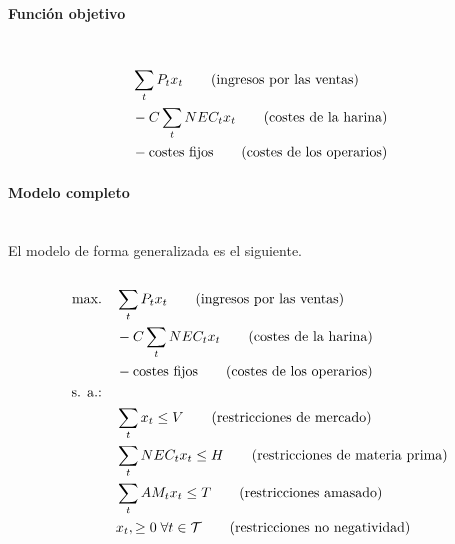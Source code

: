 \paragraph{Función objetivo}\mbox{}\\

\begin{align}
             & \sum_tP_t{x_t}  \qquad \mbox{(ingresos por las ventas)} \notag \\
             & -C\sum_t  NEC_t {x_t} \qquad \mbox{(costes de la harina)} \notag \\
             & -\mbox{costes fijos} \qquad \mbox{(costes de los operarios)} \notag \\
\end{align} 



\paragraph{Modelo completo}\mbox{}\\
El modelo de forma generalizada es el siguiente.
\\
\\
\begin{align}
\mbox{max.} \quad & \sum_tP_t{x_t}  \qquad \mbox{(ingresos por las ventas)} \notag \\
             & -C\sum_t  NEC_t {x_t} \qquad \mbox{(costes de la harina)} \notag \\
             & -\mbox{costes fijos} \qquad \mbox{(costes de los operarios)} \notag \\
\mbox{s. a.:} \quad &  \notag \\		
             & \sum_t{x_t} \leq V \qquad\mbox{(restricciones de mercado)} \notag \\
             &  \sum_t{NEC_tx_t} \leq H \qquad\mbox{(restricciones de materia prima)}   \notag \\
             & \sum_t{AM_tx_t} \leq T \qquad \mbox{(restricciones amasado)} \notag \\
             & x_t,  \geq 0 \; \forall t \in \mathcal{T} \qquad \mbox{(restricciones no negatividad)} \notag
\end{align} 
